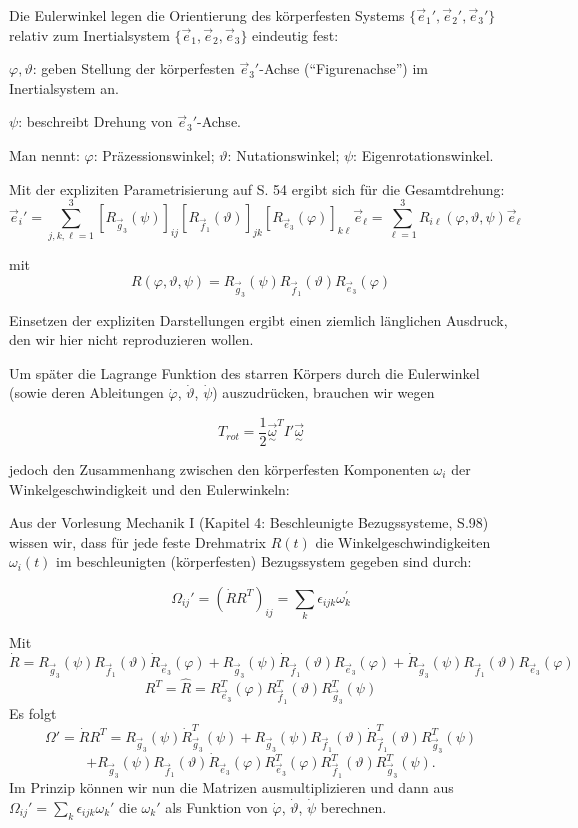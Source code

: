 \documentclass[10pt, letterpaper]{article}
\begin{document}
Die Eulerwinkel legen die Orientierung des körperfesten Systems $\{\vec{e}_1', \vec{e}_2', \vec{e}_3'\}$ relativ zum Inertialsystem $\{\vec{e}_1, \vec{e}_2, \vec{e}_3\}$ eindeutig fest:

$\varphi,\vartheta$: geben Stellung der körperfesten $\vec{e}_3'$-Achse (``Figurenachse'') im Inertialsystem an.

$\psi$: beschreibt Drehung von $\vec{e}_3'$-Achse.

Man nennt: \quad $\varphi$: Präzessionswinkel; $\vartheta$: Nutationswinkel; $\psi$: Eigenrotationswinkel.

Mit der expliziten Parametrisierung auf S. 54 ergibt sich für die Gesamtdrehung:
\[\vec{e}_i' = \sum_{j,k,\ell=1}^3 [R_{\vec{g}_3}(\psi)]_{ij} [R_{\vec{f}_1}(\vartheta)]_{jk} [R_{\vec{e}_3}(\varphi)]_{k\ell} \vec{e}_\ell = \sum_{\ell=1}^3 R_{i\ell}(\varphi,\vartheta,\psi)\vec{e}_\ell\]

mit 
\[R(\varphi,\vartheta,\psi) = R_{\vec{g}_3}(\psi) R_{\vec{f}_1}(\vartheta) R_{\vec{e}_3}(\varphi)\]

Einsetzen der expliziten Darstellungen ergibt einen ziemlich länglichen Ausdruck, den wir hier nicht reproduzieren wollen.

Um später die Lagrange Funktion des starren Körpers durch die Eulerwinkel (sowie deren Ableitungen $\dot{\varphi}$, $\dot{\vartheta}$, $\dot{\psi}$) auszudrücken, brauchen wir wegen

\[T_{rot} = \frac{1}{2} \vec{\underset{\sim}{\omega}}^T I' \vec{\underset{\sim}{\omega}}\]

jedoch den Zusammenhang zwischen den körperfesten Komponenten $\omega_i$ der Winkelgeschwindigkeit und den Eulerwinkeln:

Aus der Vorlesung Mechanik I (Kapitel 4: Beschleunigte Bezugssysteme, S.98) wissen wir, dass für jede feste Drehmatrix $R(t)$ die Winkelgeschwindigkeiten $\omega_i(t)$ im beschleunigten (körperfesten) Bezugssystem gegeben sind durch:

\[\Omega_{ij}' = (\dot{R}R^T)_{ij} = \sum_k \epsilon_{ijk} \omega_k^\prime\]

Mit 
$$\dot{R} = R_{\vec{g}_3}(\psi) R_{\vec{f}_1}(\vartheta) \dot{R}_{\vec{e}_3}(\varphi) + R_{\vec{g}_3}(\psi) \dot{R}_{\vec{f}_1}(\vartheta) R_{\vec{e}_3}(\varphi) + \dot{R}_{\vec{g}_3}(\psi) R_{\vec{f}_1}(\vartheta) R_{\vec{e}_3}(\varphi)$$
$$R^T = \hat{R} = R_{\vec{e}_3}^T(\varphi) R_{\vec{f}_1}^T(\vartheta) R_{\vec{g}_3}^T(\psi)$$
Es folgt
\[\Omega' = \dot{R}R^T = R_{\vec{g}_3}(\psi) \dot{R}_{\vec{g}_3}^T(\psi) + R_{\vec{g}_3}(\psi)R_{\vec{f}_1}(\vartheta) \dot{R}_{\vec{f}_1}^T(\vartheta) R_{\vec{g}_3}^T(\psi)\]
\[+ R_{\vec{g}_3}(\psi) R_{\vec{f}_1}(\vartheta) \dot{R}_{\vec{e}_3}(\varphi) R_{\vec{e}_3}^T(\varphi) R_{\vec{f}_1}^T(\vartheta) R_{\vec{g}_3}^T(\psi).\]
Im Prinzip können wir nun die Matrizen ausmultiplizieren und dann aus $\Omega_{ij}' = \sum_k \epsilon_{ijk} \omega_k'$ die $\omega_k'$ als Funktion von $\dot{\varphi}$, $\dot{\vartheta}$, $\dot{\psi}$ berechnen.
\end{document}
